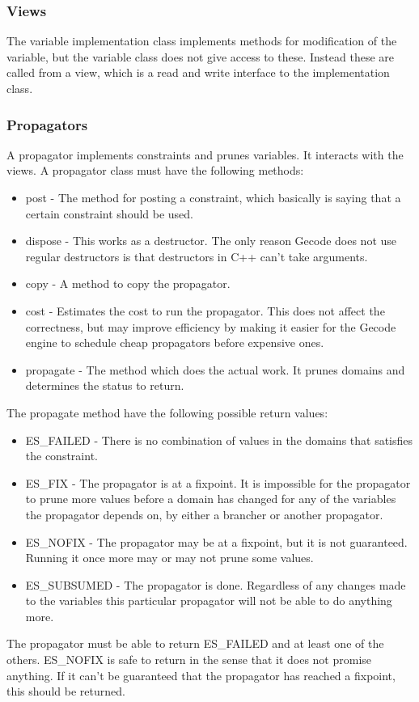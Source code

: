 \documentclass[a4paper,11pt]{article}
\begin{document}
\subsubsection{Views}
The variable implementation class implements methods for modification of the variable, but the variable class does not give access to these. Instead these are called from a view, which is a read and write interface to the implementation class.

\subsubsection{Propagators}
A propagator implements constraints and prunes variables. It interacts with the views. A propagator class must have the following methods:
\begin{itemize}
\item{post} - The method for posting a constraint, which basically is saying that a certain constraint should be used.
\item{dispose} - This works as a destructor. The only reason Gecode does not use regular destructors is that destructors in C++ can't take arguments.
\item{copy} - A method to copy the propagator.
\item{cost} - Estimates the cost to run the propagator. This does not affect the correctness, but may improve efficiency by making it easier for the Gecode engine to schedule cheap propagators before expensive ones.
\item{propagate} - The method which does the actual work. It prunes domains and determines the status to return.
\end{itemize}
The propagate method have the following possible return values:
\begin{itemize}
\item{ES\_FAILED} - There is no combination of values in the domains that satisfies the constraint. 
\item{ES\_FIX} - The propagator is at a fixpoint. It is impossible for the propagator to prune more values before a domain has changed for any of the variables the propagator depends on, by either a brancher or another propagator.
\item{ES\_NOFIX} - The propagator may be at a fixpoint, but it is not guaranteed. Running it once more may or may not prune some values. 
\item{ES\_SUBSUMED} - The propagator is done. Regardless of any changes made to the variables this particular propagator will not be able to do anything more.
\end{itemize}
The propagator must be able to return ES\_FAILED and at least one of the others. ES\_NOFIX is safe to return in the sense that it does not promise anything. If it can't be guaranteed that the propagator has reached a fixpoint, this should be returned. 
\end{document}
